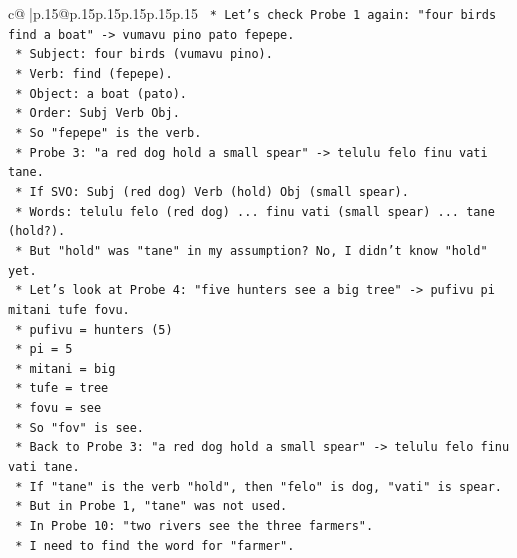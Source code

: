 \documentclass{article}
\begin{document}
{\begin{supertabular}{c@{$\;$}|p{.15\linewidth}@{}p{.15\linewidth}p{.15\linewidth}p{.15\linewidth}p{.15\linewidth}p{.15\linewidth}}
{{{\texttt{                *   Let's check Probe 1 again: "four birds find a boat" {-}> vumavu pino pato fepepe.} \\
\texttt{                    *   Subject: four birds (vumavu pino).} \\
\texttt{                    *   Verb: find (fepepe).} \\
\texttt{                    *   Object: a boat (pato).} \\
\texttt{                    *   Order: Subj Verb Obj.} \\
\texttt{                    *   So "fepepe" is the verb.} \\
\texttt{                *   Probe 3: "a red dog hold a small spear" {-}> telulu felo finu vati tane.} \\
\texttt{                    *   If SVO: Subj (red dog) Verb (hold) Obj (small spear).} \\
\texttt{                    *   Words: telulu felo (red dog) ... finu vati (small spear) ... tane (hold?).} \\
\texttt{                    *   But "hold" was "tane" in my assumption? No, I didn't know "hold" yet.} \\
\texttt{                    *   Let's look at Probe 4: "five hunters see a big tree" {-}> pufivu pi mitani tufe fovu.} \\
\texttt{                        *   pufivu = hunters (5)} \\
\texttt{                        *   pi = 5} \\
\texttt{                        *   mitani = big} \\
\texttt{                        *   tufe = tree} \\
\texttt{                        *   fovu = see} \\
\texttt{                    *   So "fov" is see.} \\
\texttt{                    *   Back to Probe 3: "a red dog hold a small spear" {-}> telulu felo finu vati tane.} \\
\texttt{                        *   If "tane" is the verb "hold", then "felo" is dog, "vati" is spear.} \\
\texttt{                        *   But in Probe 1, "tane" was not used.} \\
\texttt{                        *   In Probe 10: "two rivers see the three farmers".} \\
\texttt{                        *   I need to find the word for "farmer".} \\
}}}
\end{supertabular}}
\end{document}
